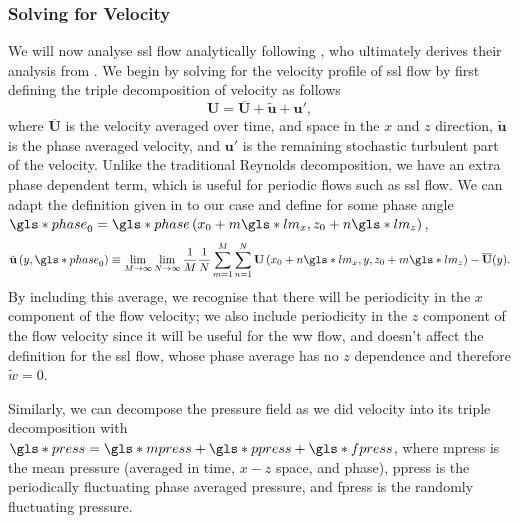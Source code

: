 \subsubsection{Solving for Velocity}
We will now analyse \gls{ssl} flow analytically following \textcite{chernyshenko2013}, who ultimately derives their analysis from \textcite{viotti2009}. We begin by solving for the velocity profile of \gls{ssl} flow by first defining the triple decomposition of velocity as follows
\begin{equation}
	\mathbf{U} = \overline{\mathbf{U} }+\tilde{\mathbf{u} }+\mathbf{u'}  
,\end{equation}
where $\overline{\mathbf{U} }$ is the velocity averaged over time, and space in the $x$ and  $z$ direction, $\tilde{\mathbf{u} }$ is the phase averaged velocity, and $\mathbf{u'} $ is the remaining stochastic turbulent part of the velocity. Unlike the traditional Reynolds decomposition, we have an extra phase dependent term, which is useful for periodic flows such as \gls{ssl} flow. We can adapt the definition given in \cite{baj2015} to our case and define for some phase angle $\gls*{phase}_0=\gls*{phase}\left(x_0+m \gls*{lm}_x,z_0+n \gls*{lm}_z\right)$,
\begin{equation}
	\tilde{\mathbf{u} }\left(y,\gls*{phase}_0\right)\equiv\lim_{M\to\infty}\lim_{N\to\infty}\frac{1}{M}\frac{1}{N} \sum_{m=1}^{M} \sum_{n=1}^{N} \mathbf{U}\left(x_0+n \gls*{lm}_x,y,z_0 +m \gls*{lm}_z\right)-\overline{\mathbf{U} }(y)  
.\end{equation}
By including this average, we recognise that there will be periodicity in the $x$ component of the flow velocity; we also include periodicity in the $z$ component of the flow velocity since it will be useful for the \gls{ww} flow, and doesn't affect the definition for the \gls{ssl} flow, whose phase average has no $z$ dependence and therefore $\tilde{w}=0$.

Similarly, we can decompose the pressure field as we did velocity into its triple decomposition with $\gls*{press}=\gls*{mpress}+\gls*{ppress}+\gls*{fpress}$, where \gls*{mpress} is the mean pressure (averaged in time, $x-z$ space, and phase), \gls*{ppress} is the periodically fluctuating phase averaged pressure, and \gls*{fpress} is the randomly fluctuating pressure.

